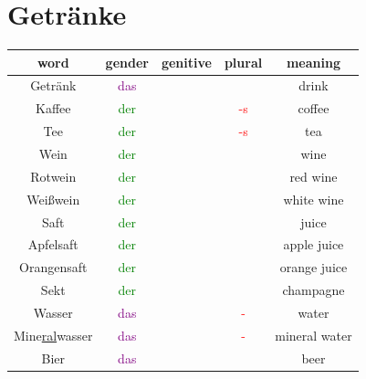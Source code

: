\section{Getränke}
\begin{center}
    \begin{tabular} {|c|c|c|c|c|}
        \hline
        \rowcolor{gray}
        word                      & gender                  & genitive & plural              & meaning       \\
        \hline
        Getränk                   & \textcolor{purple}{das} &          &                     & drink         \\
        \hline
        Kaffee                    & \textcolor{green}{der}  &          & \textcolor{red}{-s} & coffee        \\
        \hline
        Tee                       & \textcolor{green}{der}  &          & \textcolor{red}{-s} & tea           \\
        \hline
        Wein                      & \textcolor{green}{der}  &          &                     & wine          \\
        Rotwein                   & \textcolor{green}{der}  &          &                     & red wine      \\
        Weißwein                  & \textcolor{green}{der}  &          &                     & white wine    \\
        \hline
        Saft                      & \textcolor{green}{der}  &          &                     & juice         \\
        Apfelsaft                 & \textcolor{green}{der}  &          &                     & apple juice   \\
        Orangensaft               & \textcolor{green}{der}  &          &                     & orange juice  \\
        \hline
        Sekt                      & \textcolor{green}{der}  &          &                     & champagne     \\
        \hline
        Wasser                    & \textcolor{purple}{das} &          & \textcolor{red}{-}  & water         \\
        Mine\underline{ral}wasser & \textcolor{purple}{das} &          & \textcolor{red}{-}  & mineral water \\
        \hline
        Bier                      & \textcolor{purple}{das} &          &                     & beer          \\

\end{tabular}
\end{center}
